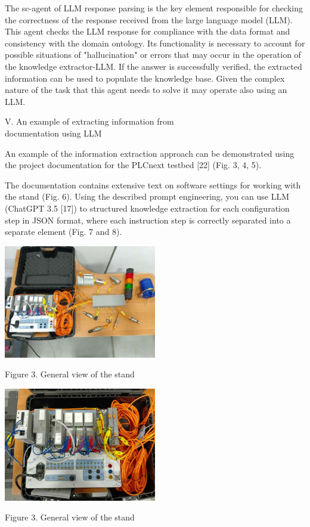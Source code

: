 \documentclass[11pt,final]{article}
\begin{document}
\begin{multicols}{2}
        The sc-agent of LLM response parsing is the key element responsible for checking the correctness of the response received from the large language model (LLM). This agent checks the LLM response for compliance with the data format and consistency with the domain ontology. Its functionality is necessary to account for possible situations of "hallucination" or errors that may occur in the operation of the knowledge extractor-LLM. If the answer is successfully verified, the extracted information can be used to populate the knowledge base. Given the complex nature of the task that this agent needs to solve it may operate also using an LLM.\\

        \begin{center}
            V. An example of extracting information from\\documentation using LLM
        \end{center}

        An example of the information extraction approach can be demonstrated using the project documentation for the PLCnext testbed [22] (Fig. 3, 4, 5).

        \columnbreak

        The documentation contains extensive text on software settings for working with the stand (Fig. 6). Using the described prompt engineering, you can use LLM (ChatGPT 3.5 [17]) to structured knowledge extraction for each configuration step in JSON format, where each instruction step is correctly separated into a separate element (Fig. 7 and 8).

            \vspace{1em}
        {\centering\includegraphics[width=0.5\textwidth]{1_mat.jpg}}
        \begin{center}
            Figure 3. General view of the stand
        \end{center}
            \vspace{1.5em}
        {\centering\includegraphics[width=0.5\textwidth]{2_mat.jpg}}
        \begin{center}
            Figure 3. General view of the stand
        \end{center}


\end{multicols}
\end{document}
